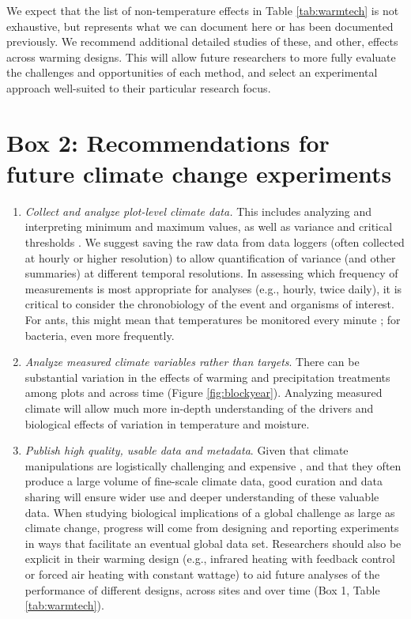 \documentclass{article}
\begin{document}
\par We expect that the list of non-temperature effects in Table \ref{tab:warmtech} is not exhaustive, but represents what we can document here or has been documented previously. We recommend additional detailed studies of these, and other, effects across warming designs. This will allow future researchers to more fully evaluate the challenges and opportunities of each method, and select an experimental approach well-suited to their particular research focus. 

\section* {Box 2: Recommendations for future climate change experiments} 
\begin{enumerate}
\item\textit{Collect and analyze plot-level climate data.} This includes analyzing and interpreting minimum and maximum values, as well as variance and critical thresholds \citep[e.g., the number and duration of freeze-thaw events and accumulated chilling hours,][]{mcdaniel2014,vasseur2014}. We suggest saving the raw data from data loggers (often collected at hourly or higher resolution) to allow quantification of variance (and other summaries) at different temporal resolutions. In assessing which frequency of measurements is most appropriate for analyses (e.g., hourly, twice daily), it is critical to consider the chronobiology of the event and organisms of interest. For ants, this might mean that temperatures be monitored every minute \citep{shavit2017}; for bacteria, even more frequently. 
\item\textit{Analyze measured climate variables rather than targets}. There can be substantial variation in the effects of warming and precipitation treatments among plots and across time (Figure \ref{fig:blockyear}). Analyzing measured climate will allow much more in-depth understanding of the drivers and biological effects of variation in temperature and moisture.
\item\textit{Publish high quality, usable data and metadata}. Given that climate manipulations are logistically challenging and expensive \citep{aronson2009}, and that they often produce a large volume of fine-scale climate data, good curation and data sharing will ensure wider use and deeper understanding of these valuable data. When studying biological implications of a global challenge as large as climate change, progress will come from designing and reporting experiments in ways that facilitate an eventual global data set. Researchers should also be explicit in their warming design (e.g., infrared heating with feedback control or forced air heating with constant wattage) to aid future analyses of the performance of different designs, across sites and over time (Box 1, Table \ref{tab:warmtech}). 

\end{enumerate}
\end{document}
